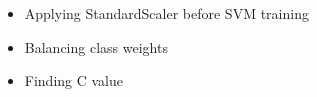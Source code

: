 \begin{itemize}
	\item Applying StandardScaler before SVM training
	\item Balancing class weights
	\item Finding C value
\end{itemize}
